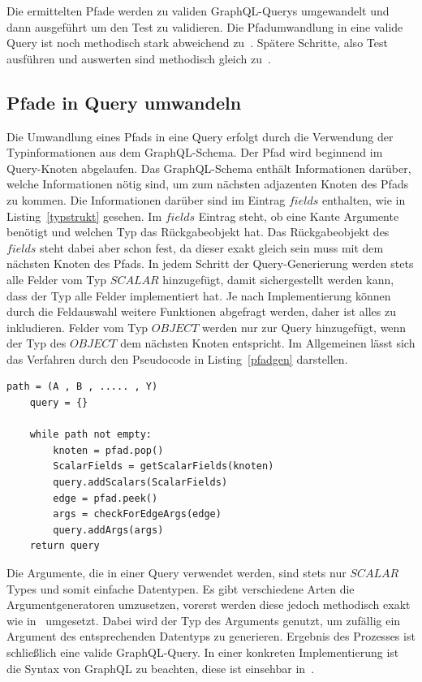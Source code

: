 Die ermittelten Pfade werden zu validen GraphQL-Querys umgewandelt und dann ausgeführt um den Test zu validieren.
Die Pfadumwandlung in eine valide Query ist noch methodisch stark abweichend zu~\cite{property-based-testing}.
Spätere Schritte, also Test ausführen und auswerten sind methodisch gleich zu~\cite{property-based-testing}.

\subsection{Pfade in Query umwandeln}
\label{pfadquery}

Die Umwandlung eines Pfads in eine Query erfolgt durch die Verwendung der Typinformationen aus dem GraphQL-Schema.
Der Pfad wird beginnend im Query-Knoten abgelaufen.
Das GraphQL-Schema enthält Informationen darüber, welche Informationen nötig sind, um zum nächsten adjazenten Knoten des Pfads zu kommen.
Die Informationen darüber sind im Eintrag $fields$ enthalten, wie in Listing~\ref{typstrukt} gesehen.
Im $fields$ Eintrag steht, ob eine Kante Argumente benötigt und welchen Typ das Rückgabeobjekt hat.
Das Rückgabeobjekt des $fields$ steht dabei aber schon fest, da dieser exakt gleich sein muss mit dem nächsten Knoten des Pfads.
In jedem Schritt der Query-Generierung werden stets alle Felder vom Typ $SCALAR$ hinzugefügt, damit sichergestellt werden kann, dass
der Typ alle Felder implementiert hat.
Je nach Implementierung können durch die Feldauswahl weitere Funktionen abgefragt werden, daher ist alles zu inkludieren.
Felder vom Typ $OBJECT$ werden nur zur Query hinzugefügt, wenn der Typ des $OBJECT$ dem nächsten Knoten entspricht.
Im Allgemeinen lässt sich das Verfahren durch den Pseudocode in Listing~\ref{pfadgen} darstellen. \\

\begin{lstlisting}[caption={Pseudocode für Pfadgenerierung},captionpos=b, label={pfadgen}]
    path = (A , B , ..... , Y)
    query = {}

    while path not empty:
        knoten = pfad.pop()
        ScalarFields = getScalarFields(knoten)
        query.addScalars(ScalarFields)
        edge = pfad.peek()
        args = checkForEdgeArgs(edge)
        query.addArgs(args)
    return query
\end{lstlisting}

Die Argumente, die in einer Query verwendet werden, sind stets nur $SCALAR$ Types und somit einfache Datentypen.
Es gibt verschiedene Arten die Argumentgeneratoren umzusetzen, vorerst werden diese jedoch methodisch exakt wie in~\cite{property-based-testing} umgesetzt.
Dabei wird der Typ des Arguments genutzt, um zufällig ein Argument des entsprechenden Datentyps zu generieren.
Ergebnis des Prozesses ist schließlich eine valide GraphQL-Query.
In einer konkreten Implementierung ist die Syntax von GraphQL zu beachten, diese ist einsehbar in~\cite[2.3 Language Operations]{graphqlspecification}.

